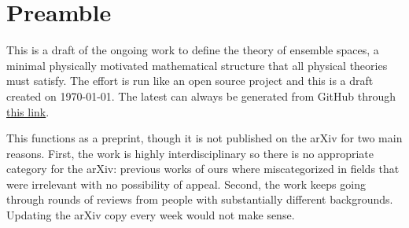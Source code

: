 \documentclass[11pt,letterpaper,fleqn]{memoir}
\begin{document}
%	
	
%	
\chapter*{Preamble}

This is a draft of the ongoing work to define the theory of ensemble spaces, a minimal physically motivated mathematical structure that all physical theories must satisfy. The effort is run like an open source project and this is a draft created on \today. The latest can always be generated from GitHub through \href{https://latexonline.cc/compile?git=https%3A%2F%2Fgithub.com%2Fassumptionsofphysics%2Fbook&target=art_pm_EnsembleSpaces.tex&command=pdflatex}{this link}.

This functions as a preprint, though it is not published on the arXiv for two main reasons. First, the work is highly interdisciplinary so there is no appropriate category for the arXiv: previous works of ours where miscategorized in fields that were irrelevant with no possibility of appeal. Second, the work keeps going through rounds of reviews from people with substantially different backgrounds. Updating the arXiv copy every week would not make sense.

\setcounter{tocdepth}{3}
\tableofcontents
	
	
	
	
\end{document}
